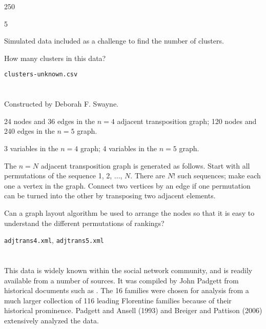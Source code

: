 \bigskip
{} 250

 5

\smallskip
{} Simulated data included as a challenge to 
find the number of clusters. 

\bigskip
{} How many clusters in this data?

\bigskip
{}

\smallskip
{\tt clusters-unknown.csv}

\section{}

 Constructed by Deborah F. Swayne.

\bigskip
{} 24 nodes and 36 edges in the $n = 4$
adjacent transposition graph; 120 nodes and 240 edges in the $n = 5$
graph.

 3 variables in the $n = 4$ graph; 
4 variables in the $n = 5$ graph.

\smallskip
{} The $n = N$ adjacent transposition graph
is generated as follows.  Start with all permutations of the sequence
1, 2, ..., $N$. There are $N!$ such sequences; make each one a vertex
in the graph.  Connect two vertices by an edge if one permutation can
be turned into the other by transposing two adjacent elements.

\smallskip
{} Can a graph layout algorithm be used to 
arrange the nodes so that it is easy to understand the different
permutations of rankings?

\bigskip
{} 

\smallskip
{\tt adjtrans4.xml}, {\tt adjtrans5.xml}

\section{}


This data is widely known within the social network community, and is
readily available from a number of sources.  It was compiled by John
Padgett from historical documents such as .  The 16
families were chosen for analysis from a much larger collection of 116
leading Florentine families because of their historical prominence.
Padgett and Ansell (1993) \nocite{Padgett93} and Breiger and Pattison
(2006) \nocite{BreigerPattison86} extensively analyzed the data.

